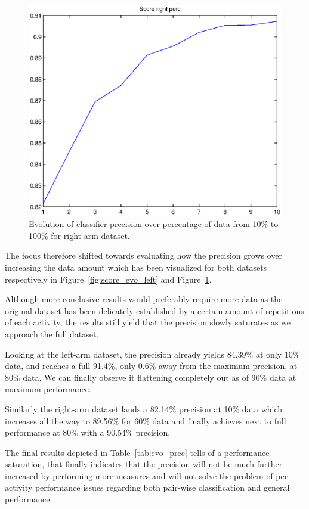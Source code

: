 \documentclass{sig-alternate}
\begin{document}
\begin{figure}
  \centering
  \includegraphics[scale=0.4]{./matlab_output/score_perc_right_3.eps}
  \caption{Evolution of classifier precision over percentage of data from 10\% to 100\% for right-arm dataset.}
  \label{fig:score_evo_right}
\end{figure}

The focus therefore shifted towards evaluating how the precision grows over increasing the data amount which has been visualized for both datasets respectively in Figure~\ref{fig:score_evo_left} and Figure~\ref{fig:score_evo_right}. 

Although more conclusive results would preferably require more data as the original dataset has been delicately established by a certain amount of repetitions of each activity, the results still yield that the precision slowly saturates as we approach the full dataset.

Looking at the left-arm dataset, the precision already yields 84.39\% at only 10\% data, and reaches a full 91.4\%, only 0.6\% away from the maximum precision, at 80\% data. We can finally observe it flattening completely out as of 90\% data at maximum performance.

Similarly the right-arm dataset lands a 82.14\% precision at 10\% data which increases all the way to 89.56\% for 60\% data and finally achieves next to full performance at 80\% with a 90.54\% precision.

The final results depicted in Table~\ref{tab:evo_prec} tells of a performance saturation, that finally indicates that the precision will not be much further increased by performing more measures and will not solve the problem of per-activity performance issues regarding both pair-wise classification and general performance.
\end{document}
